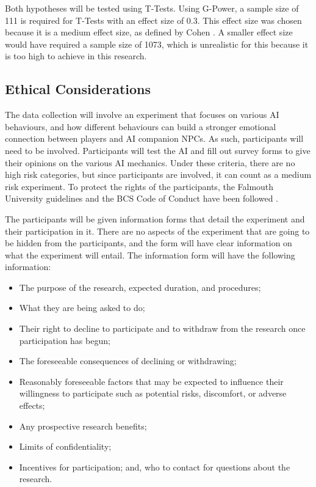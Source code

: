 \documentclass{IEEEtran}
\begin{document}
Both hypotheses will be tested using T-Tests. Using G-Power, a sample size of 111 is required for T-Tests with an effect size of 0.3. This effect size was chosen because it is a medium effect size, as defined by Cohen \cite{cohen1988statistical}. A smaller effect size would have required a sample size of 1073, which is unrealistic for this because it is too high to achieve in this research.


\subsection{Ethical Considerations}
\label{EthicalConsiderations}

The data collection will involve an experiment that focuses on various AI behaviours, and how different behaviours can build a stronger emotional connection between players and AI companion NPCs. As such, participants will need to be involved. Participants will test the AI and fill out survey forms to give their opinions on the various AI mechanics. Under these criteria, there are no high risk categories, but since participants are involved, it can count as a medium risk experiment. To protect the rights of the participants, the Falmouth University guidelines and the BCS Code of Conduct have been followed \cite{BCSConductCode}.

The participants will be given information forms that detail the experiment and their participation in it. There are no aspects of the experiment that are going to be hidden from the participants, and the form will have clear information on what the experiment will entail. The information form will have the following information:

\begin{itemize}
	\item The purpose of the research, expected duration, and procedures;
	\item What they are being asked to do;
	\item Their right to decline to participate and to withdraw from the research once participation has begun;
	\item The foreseeable consequences of declining or withdrawing;
	\item Reasonably foreseeable factors that may be expected to influence their willingness to participate such as potential risks, discomfort, or adverse effects;
	\item Any prospective research benefits;
	\item Limits of confidentiality;
	\item Incentives for participation; and,
who to contact for questions about the research. 
\end{itemize}
\end{document}
